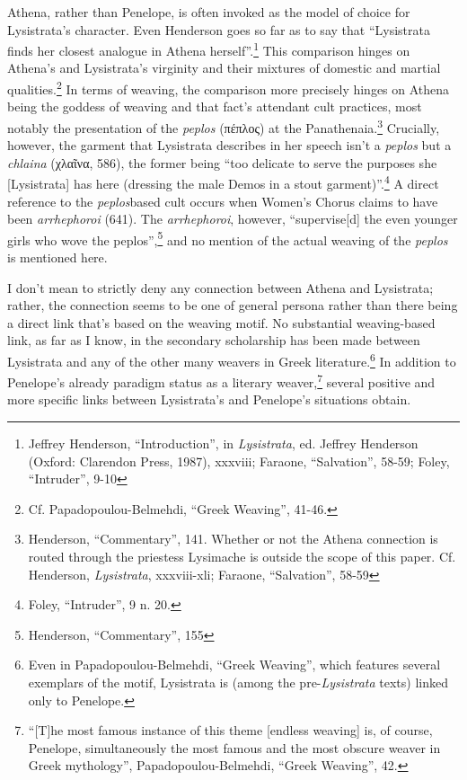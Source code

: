\documentclass[12pt]{article}
\begin{document}
Athena, rather than Penelope, is often invoked as the model of choice for Lysistrata's character. Even Henderson goes so far as to say that ``Lysistrata finds her closest analogue in Athena herself''.\footnote{Jeffrey Henderson, ``Introduction'', in \textit{Lysistrata}, ed. Jeffrey Henderson (Oxford: Clarendon Press, 1987), xxxviii; Faraone, ``Salvation'', 58-59; Foley, ``Intruder'', 9-10} This comparison hinges on Athena's and Lysistrata's virginity and their mixtures of domestic and martial qualities.\footnote{Cf. Papadopoulou-Belmehdi, ``Greek Weaving'', 41-46.} In terms of weaving, the comparison more precisely hinges on Athena being the goddess of weaving and that fact's attendant cult practices, most notably the presentation of the \textit{peplos} (πέπλος) at the Panathenaia.\footnote{Henderson, ``Commentary'', 141. Whether or not the Athena connection is routed through the priestess Lysimache is outside the scope of this paper. Cf. Henderson, \textit{Lysistrata}, xxxviii-xli; Faraone, ``Salvation'', 58-59} Crucially, however, the garment that Lysistrata describes in her speech isn't a \textit{peplos} but a \textit{chlaina} (χλαῖνα, 586), the former being ``too delicate to serve the purposes she [Lysistrata] has here (dressing the male Demos in a stout garment)''.\footnote{Foley, ``Intruder'', 9 n. 20.} A direct reference to the \textit{peplos}\-based cult occurs when Women's Chorus claims to have been \textit{arrhephoroi} (641). The \textit{arrhephoroi}, however, ``supervise[d] the even younger girls who wove the peplos'',\footnote{Henderson, ``Commentary'', 155} and no mention of the actual weaving of the \textit{peplos} is mentioned here.

I don't mean to strictly deny any connection between Athena and Lysistrata; rather, the connection seems to be one of general persona rather than there being a direct link that's based on the weaving motif. No substantial weaving-based link, as far as I know, in the secondary scholarship has been made between Lysistrata and any of the other many weavers in Greek literature.\footnote{Even in Papadopoulou-Belmehdi, ``Greek Weaving'', which features several exemplars of the motif, Lysistrata is (among the pre-\textit{Lysistrata} texts) linked only to Penelope.} In addition to Penelope's already paradigm status as a literary weaver,\footnote{``[T]he most famous instance of this theme [endless weaving] is, of course, Penelope, simultaneously the most famous and the most obscure weaver in Greek mythology'', Papadopoulou-Belmehdi, ``Greek Weaving'', 42.} several positive and more specific links between Lysistrata's and Penelope's situations obtain.
\end{document}
